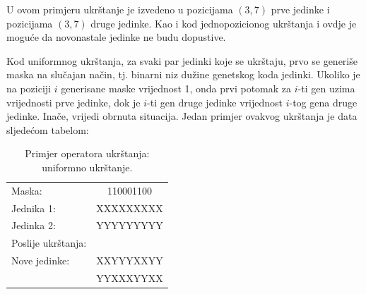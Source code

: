 \documentclass[a4paper, utf8, 11pt, colorlinks]{book}
\begin{document}
U ovom primjeru ukrštanje je izvedeno u pozicijama $(3,7)$ prve jedinke i pozicijama $(3, 7)$ druge jedinke. Kao i kod jednopozicionog ukrštanja i ovdje je moguće da novonastale jedinke ne budu dopustive. 

Kod uniformnog ukrštanja, za svaki par jedinki koje se ukrštaju, prvo se generiše maska na slučajan način, tj. binarni niz dužine genetskog koda jedinki. Ukoliko je na poziciji $i$ generisane maske vrijednost 1, onda prvi potomak za $i$-ti gen uzima vrijednosti prve jedinke, dok je $i$-ti gen druge jedinke vrijednost $i$-tog gena druge jedinke. Inače, vrijedi obrnuta situacija. Jedan primjer ovakvog ukrštanja je data sljedećom tabelom: 

\begin{table}[H]
	\centering
	
	\begin{tabular}{lc}
		Maska:      &   110001100   \\
		Jednika 1:  &	XXXXXXXXX   \\ 
		Jedinka 2: &	YYYYYYYYY   \\
		Poslije ukrštanja:  &       \\ \hline
		Nove jedinke:            &  XXYYYXXYY    \\
		            &  YYXXXYYXX    \\
	\end{tabular}
	\caption{Primjer operatora ukrštanja: uniformno ukrštanje.}
\end{table}
\end{document}
